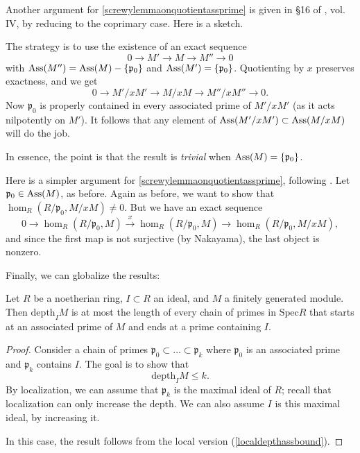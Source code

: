 \begin{exercise} 
Another argument  for \cref{screwylemmaonquotientassprime} is given in \S 16 of \cite{EGA}, vol. IV, by reducing to
the coprimary case. Here is a sketch.

The strategy is to use the existence of an exact sequence
\[ 0 \to M' \to M \to M'' \to 0  \]
with $\operatorname{Ass}(M'') = \operatorname{Ass}(M) - \left\{\mathfrak{p}_0\right\}$ and
$\operatorname{Ass}(M') = \left\{\mathfrak{p}_0\right\}$. 
Quotienting by $x$ preserves exactness, and we get
\[ 0 \to M'/xM' \to M/xM \to M''/xM'' \to 0.  \]
Now $\mathfrak{p}_0$ is properly contained in every associated prime of
$M'/xM'$ (as it acts nilpotently on $M'$). It follows that any element of
$\operatorname{Ass}(M'/xM') \subset \operatorname{Ass}(M/xM)$ will do the job.

In essence, the point is that the result is \emph{trivial} when $\operatorname{Ass}(M)
= \left\{\mathfrak{p}_0\right\}$.
\end{exercise} 

\begin{exercise} 
Here is a simpler argument for \cref{screwylemmaonquotientassprime},
following \cite{Se65}. 
Let $\mathfrak{p}_0 \in \operatorname{Ass}(M)$, as before. Again as before, we want  to show that
$\hom_R(R/\mathfrak{p}_0, M/xM) \neq 0$.
But we have an exact sequence 
\[ 0 \to \hom_R(R/\mathfrak{p}_0, M) 
\stackrel{x}{\to} \hom_R(R/\mathfrak{p}_0, M) \to
\hom_R(R/\mathfrak{p}_0, M/xM) ,
\]
and since the first map is not surjective (by Nakayama), the last
object is nonzero.
\end{exercise} 

Finally, we can globalize the results:

\begin{proposition} 
Let $R$ be a noetherian ring, $I \subset R$ an ideal, and $M$ a finitely
generated module. Then $\mathrm{depth}_I M$ is at most the length of every  chain
of primes in $\mathrm{Spec} R$ that starts at an associated prime of $M$ and
ends at a prime containing $I$.
\end{proposition} 

\begin{proof} Consider a chain of primes $\mathfrak{p}_0 \subset \dots \subset
\mathfrak{p}_k$ where $\mathfrak{p}_0$ is an associated prime and
$\mathfrak{p}_k$ contains $I$. 
The goal is to show that 
\[  \mathrm{depth}_I M \leq k .  \]
By localization, we can assume that $\mathfrak{p}_k$ is the maximal ideal of
$R$; recall that localization can only increase the depth.
We can also assume $I$ is this maximal ideal, by increasing it.

In this case, the result follows from the local version
(\cref{localdepthassbound}). \end{proof}


